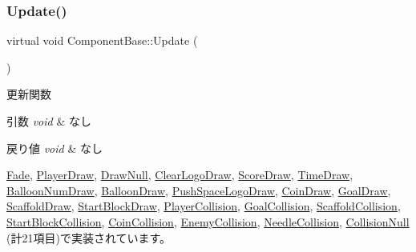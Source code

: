 \mbox{\label{class_component_base_a58e66d65bc8f3cd5ab67b4b2deab4fc2}} 
\subsubsection{\texorpdfstring{Update()}{Update()}}
{\footnotesize\ttfamily virtual void Component\+Base\+::\+Update (\begin{DoxyParamCaption}{ }\end{DoxyParamCaption})\hspace{0.3cm}{\ttfamily [pure virtual]}}



更新関数 


\begin{DoxyParams}{引数}
{\em void} & なし \\
\hline
\end{DoxyParams}

\begin{DoxyRetVals}{戻り値}
{\em void} & なし \\
\hline
\end{DoxyRetVals}


\mbox{\hyperlink{class_fade_a332851a9b9fc0b9e3bd0f536f9026004}{Fade}}, \mbox{\hyperlink{class_player_draw_aa16d0fb9345c08df3b3a626128707cf7}{Player\+Draw}}, \mbox{\hyperlink{class_draw_null_ad32a508d269de7eda8ad24ea72230464}{Draw\+Null}}, \mbox{\hyperlink{class_clear_logo_draw_a2253a9252d9ba6e23602379404ec92fc}{Clear\+Logo\+Draw}}, \mbox{\hyperlink{class_score_draw_a84fa10dee56f75616d4643b3568daf61}{Score\+Draw}}, \mbox{\hyperlink{class_time_draw_a2471360fb021ce38bec34dbe6f171b9f}{Time\+Draw}}, \mbox{\hyperlink{class_balloon_num_draw_a448d1635bbf6457187d76818b8c0aa88}{Balloon\+Num\+Draw}}, \mbox{\hyperlink{class_balloon_draw_a9314af6e3458e87fcace44a11e33126f}{Balloon\+Draw}}, \mbox{\hyperlink{class_push_space_logo_draw_a75248e42d5b677c81169be478b59141f}{Push\+Space\+Logo\+Draw}}, \mbox{\hyperlink{class_coin_draw_a6157b17bf1706b85156aad0d88acfd7e}{Coin\+Draw}}, \mbox{\hyperlink{class_goal_draw_a6e003277ed44eb9c800a616b6acbcb20}{Goal\+Draw}}, \mbox{\hyperlink{class_scaffold_draw_a62c2bb223525c9ab3e9eff4c2705d377}{Scaffold\+Draw}}, \mbox{\hyperlink{class_start_block_draw_a845ce671ce8191a68ef4fc159c2f2a93}{Start\+Block\+Draw}}, \mbox{\hyperlink{class_player_collision_a09f97f220903f5724a3af6b97af3a336}{Player\+Collision}}, \mbox{\hyperlink{class_goal_collision_a1e3995dc2f5ba2678580d06699ca6936}{Goal\+Collision}}, \mbox{\hyperlink{class_scaffold_collision_ad57ee33c985c818f7f4a5af87a060e16}{Scaffold\+Collision}}, \mbox{\hyperlink{class_start_block_collision_a0e70da365db1a2bb07c56609d28217ad}{Start\+Block\+Collision}}, \mbox{\hyperlink{class_coin_collision_a981fd9b1b8c688a757a456a56d80501b}{Coin\+Collision}}, \mbox{\hyperlink{class_enemy_collision_ab54133504d867c6d2070d2f3854a0aaf}{Enemy\+Collision}}, \mbox{\hyperlink{class_needle_collision_a9226bcc45aa952abcafa56c7af8c8627}{Needle\+Collision}}, \mbox{\hyperlink{class_collision_null_ad6ac0e9b06fcb4e3d19a5c3c1cadfe7e}{Collision\+Null}} (計21項目)で実装されています。



